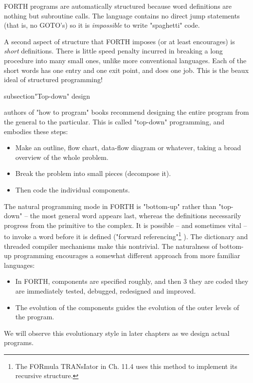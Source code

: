 FORTH programs are automatically structured because word definitions are nothing but subroutine calls. The language contains no direct jump statements (that is, no GOTO's) so it is \textit{impossible} to write "spaghetti" code.

A second aspect of structure that FORTH imposes (or at least encourages) is \textit{short} definitions. There is little speed penalty incurred in breaking a long procedure into many small ones, unlike more conventional languages. Each of the short words has one entry and one exit point, and does one job. This is the beaux ideal of structured programming!

subsection{"Top-down" design}

 authors of "how to program" books recommend designing the entire program from the general to the particular. This is called "top-down" programming, and embodies these steps:

\begin{itemize}
    \item Make an outline, ﬂow chart, data-ﬂow diagram or whatever, taking a broad overview of the whole problem.
    \item Break the problem into small pieces (decompose it).
    \item Then code the individual components.
\end{itemize}

The natural programming mode in FORTH is "bottom-up" rather than "top-down" -- the most general word appears last, whereas the definitions necessarily progress from the primitive to the complex. It is possible -- and sometimes vital -- to invoke a word before it is defined ("forward referencing"\footnote{The FORmula TRANsIator in Ch. 11.4 uses this method to implement its recursive structure.} ). The dictionary and threaded compiler mechanisms make this nontrivial. The naturalness of bottom-up programming encourages a somewhat different approach from more familiar languages:

\begin{itemize}
    \item In FORTH, components are specified roughly, and then 3 they are coded they are immediately tested, debugged, redesigned and improved.
    \item The evolution of the components guides the evolution of the outer levels of the program.
\end{itemize}

We will observe this evolutionary style in later chapters as we design actual programs.

